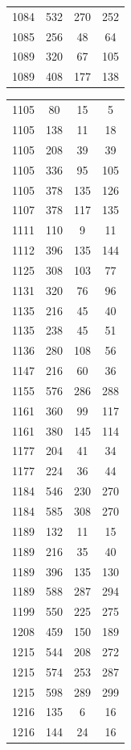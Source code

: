 \documentclass[12pt]{amsproc} %
\theoremstyle{definition}\newtheorem{defn}[thm]{Definition}
\theoremstyle{definition}\newtheorem{rem}[thm]{Remark}
\theoremstyle{definition}\newtheorem{ex}[thm]{Example}
\begin{document}
\begin{table}[ht]
\begin{minipage}{0.25\textwidth}
\begin{tabular}{c|c|c|c}
      1084&532&270&252\\ 
      1085&256&48&64\\ 
      1089&320&67&105\\ 
      1089&408&177&138\\ 
        \end{tabular}
    \end{minipage}
    \hfill
    \begin{minipage}{0.25\textwidth}
        \centering
        \begin{tabular}{c|c|c|c}  
      1105&80&15&5\\ 
      1105&138&11&18\\
      1105&208&39&39\\ 
      1105&336&95&105\\ 
      1105&378&135&126\\ 
      1107&378&117&135\\ 
      1111&110&9&11\\ 
      1112&396&135&144\\ 
      1125&308&103&77\\ 
      1131&320&76&96\\ 
      1135&216&45&40\\ 
      1135&238&45&51\\
      1136&280&108&56\\ 
      1147&216&60&36\\ 
      1155&576&286&288\\ 
      1161&360&99&117\\ 
      1161&380&145&114\\ 
      1177&204&41&34\\ 
      1177&224&36&44\\ 
      1184&546&230&270\\ 
      1184&585&308&270\\ 
      1189&132&11&15\\ 
      1189&216&35&40\\ 
      1189&396&135&130\\ 
      1189&588&287&294\\ 
      1199&550&225&275\\ 
      1208&459&150&189\\ 
      1215&544&208&272\\ 
      1215&574&253&287\\ 
      1215&598&289&299\\ 
      1216&135&6&16\\ 
      1216&144&24&16\\ 

\end{tabular}
\end{minipage}
\end{table}
\end{document}
